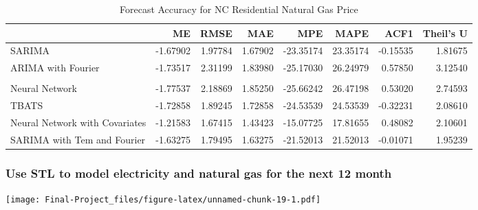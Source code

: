 \documentclass[
]{article}
\begin{document}
\begin{table}[!h]

\caption{\label{tab:unnamed-chunk-18}Forecast Accuracy for NC Residential Natural Gas Price}
\centering
\begin{tabular}[t]{l|r|r|r|r|r|r|r}
\hline
  & ME & RMSE & MAE & MPE & MAPE & ACF1 & Theil's U\\
\hline
SARIMA & -1.67902 & 1.97784 & 1.67902 & -23.35174 & 23.35174 & -0.15535 & 1.81675\\
\hline
ARIMA with Fourier & -1.73517 & 2.31199 & 1.83980 & -25.17030 & 26.24979 & 0.57850 & 3.12540\\
\hline
\cellcolor{red}{STL} & \cellcolor{red}{-1.04788} & \cellcolor{red}{1.35599} & \cellcolor{red}{1.11314} & \cellcolor{red}{-14.03428} & \cellcolor{red}{14.80904} & \cellcolor{red}{-0.33348} & \cellcolor{red}{1.28849}\\
\hline
Neural Network & -1.77537 & 2.18869 & 1.85250 & -25.66242 & 26.47198 & 0.53020 & 2.74593\\
\hline
TBATS & -1.72858 & 1.89245 & 1.72858 & -24.53539 & 24.53539 & -0.32231 & 2.08610\\
\hline
Neural Network with Covariates & -1.21583 & 1.67415 & 1.43423 & -15.07725 & 17.81655 & 0.48082 & 2.10601\\
\hline
SARIMA with Tem and Fourier & -1.63275 & 1.79495 & 1.63275 & -21.52013 & 21.52013 & -0.01071 & 1.95239\\
\hline
\end{tabular}
\end{table}

\hypertarget{use-stl-to-model-electricity-and-natural-gas-for-the-next-12-month}{%
\subsubsection{Use STL to model electricity and natural gas for the next
12
month}\label{use-stl-to-model-electricity-and-natural-gas-for-the-next-12-month}}

\texttt{[image: Final-Project\_files/figure-latex/unnamed-chunk-19-1.pdf]}
\end{document}
